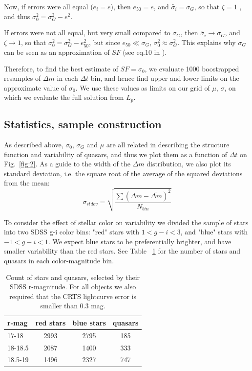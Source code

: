 \documentclass[fleqn,usenatbib]{mnras}  %
\begin{document}
Now, if errors were all equal ($e_{i} = e$), then $e_{50} = e$, and $\tilde{\sigma_{i}}= \sigma_{G}$, so that $\zeta=1$ , and thus $\sigma_{0}^{2} = \sigma_{G}^{2} - e^{2}$. 

If errors were not all equal, but very small compared to $\sigma_{G}$, then $\tilde{\sigma_{i}} \to \sigma_{G}$, and $\zeta \to 1$, so that  $\sigma_{0}^{2} = \sigma_{G}^{2} - e_{50}^{2}$, but since $e_{50} \ll \sigma_{G}$,  $\sigma_{0}^{2} \approx \sigma_{G}^{2}$. This explains why $\sigma_{G}$ can be seen as an approximation of $SF$ (see eq.10 in \cite{kozlowski2016}). 

Therefore, to find the best estimate of $SF = \sigma_{0}$, we evaluate 1000 boostrapped resamples of $\Delta m$ in each $\Delta t$ bin, and hence find upper and lower limits on the approximate value of $\sigma_{0}$. We use these values as limits on our grid  of  $\mu$, $\sigma$, on which we evaluate the full solution from  $L_{p}$. 


\subsection{Statistics, sample construction}
\label{sec:stats}
As described above, $\sigma_{0}$, $\sigma_{G}$ and $\mu$ are all related in describing the structure function and variability of quasars, and thus we plot them as a function of $\Delta t$ on Fig.~\ref{fig:2}. As a guide to the width of the $\Delta m$ distribution, we also plot its standard deviation, i.e. the square root of the average of the squared deviations from the mean:
\begin{equation}
\sigma_{stdev} = \sqrt{ \frac{\sum\left(\Delta m - \overline{\Delta m}\right)^{2} } { N_{bin}}}   
\end{equation}

To consider the effect of stellar color on variability we divided the sample of stars into two SDSS g-i color bins: "red" stars with $1<g-i<3$, and  "blue" stars with $-1<g-i<1$. We expect blue stars to be preferentially brighter, and have smaller variability than the red stars. See Table ~\ref{tab:object_count} for the number of stars and quasars in each color-magnitude bin. 

\begin{table}
\centering
\caption{Count of stars and quasars, selected by their SDSS r-magnitude. For all objects we also required that the CRTS lightcurve error is smaller than $0.3$ mag.}
\label{tab:object_count}
\begin{tabular}{ l|ccc } 
r-mag  & red stars & blue stars & quasars \\ 
 \hline
17-18   & 2993 & 2795   & 185    \\ 
18-18.5 & 2087 &  1400  & 333   \\ 
18.5-19 & 1496 &  2327  & 747   
\end{tabular}
\end{table}
 
\end{document}
